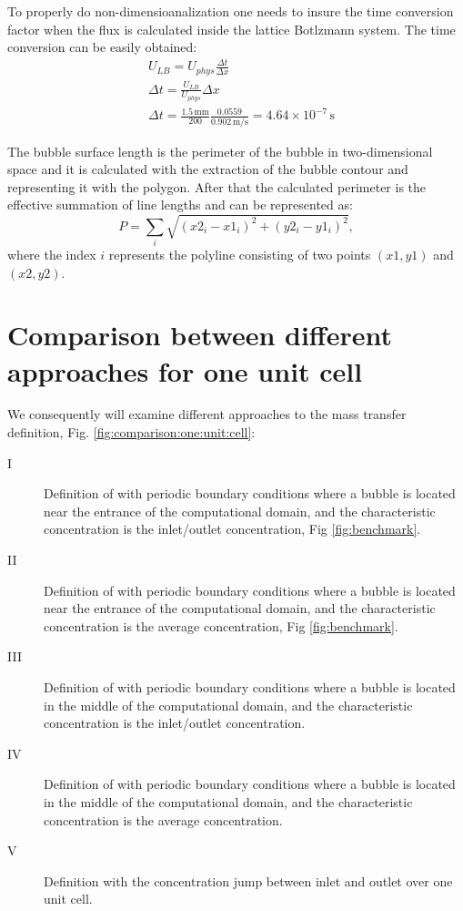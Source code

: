 \documentclass{article}
\begin{document}
To properly do
non-dimensioanalization one needs to insure the time conversion factor when the flux is calculated
inside the lattice Botlzmann system. The time conversion can be easily obtained:
\begin{equation}
\begin{aligned}
&U_{LB}=U_{phys}\frac{\Delta t}{\Delta x}\\
&\Delta t=\frac{U_{LB}}{U_{phys}}\Delta x\\
&\Delta t=\frac{1.5\,\mathrm{mm}}{200} \frac{0.0559}{0.902\,\mathrm{m/s}}=4.64\times
10^{-7}\,\mathrm{s} 
\end{aligned}
\end{equation}

The bubble surface length is the perimeter of the bubble in two-dimensional space and it is
calculated with the extraction of the bubble contour and representing it with the polygon. After
that the calculated perimeter is the effective summation of line lengths and can be represented as:
\begin{equation}
P=\sum_i{\sqrt{(x2_i-x1_i)^2+(y2_i-y1_i)^2}},
\end{equation}
where the index $i$ represents the polyline consisting of two points $(x1,y1)$ and $(x2,y2)$.

\section{Comparison between different approaches for one unit cell}
We consequently will examine different approaches to the mass transfer definition, Fig.
\ref{fig:comparison:one:unit:cell}:
\begin{description}
\item[I] Definition of \citet{vanbaten-circular} with periodic boundary conditions where a bubble
is located near the entrance of the computational domain, and the characteristic concentration is
the inlet/outlet concentration, Fig \ref{fig:benchmark}. 
\item[II] Definition of \citet{vanbaten-circular} with periodic boundary conditions where a bubble
is located near the entrance of the computational domain, and the characteristic concentration is
the average concentration, Fig \ref{fig:benchmark}.
\item[III] Definition of \citet{vanbaten-circular} with periodic boundary conditions where a
bubble is located in the middle of the computational domain, and the characteristic concentration
is the inlet/outlet concentration.
\item[IV] Definition of \citet{vanbaten-circular} with periodic boundary conditions where a bubble
is located in the middle of the computational domain, and the characteristic concentration is the
average concentration.
\item[V] Definition with the concentration jump between inlet and outlet over one unit cell.
\end{description}
\end{document}
